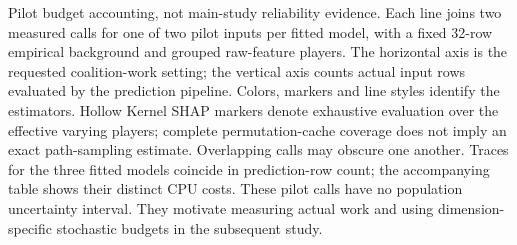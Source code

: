Pilot budget accounting, not main-study reliability evidence. Each line joins two measured calls for one of two pilot inputs per fitted model, with a fixed 32-row empirical background and grouped raw-feature players. The horizontal axis is the requested coalition-work setting; the vertical axis counts actual input rows evaluated by the prediction pipeline. Colors, markers and line styles identify the estimators. Hollow Kernel SHAP markers denote exhaustive evaluation over the effective varying players; complete permutation-cache coverage does not imply an exact path-sampling estimate. Overlapping calls may obscure one another. Traces for the three fitted models coincide in prediction-row count; the accompanying table shows their distinct CPU costs. These pilot calls have no population uncertainty interval. They motivate measuring actual work and using dimension-specific stochastic budgets in the subsequent study.
